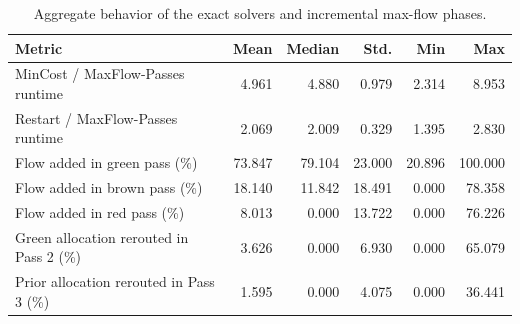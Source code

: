 \begin{table}
\caption{Aggregate behavior of the exact solvers and incremental max-flow phases.}
\label{tab:pass-mechanism-summary}
\begin{tabular}{lrrrrr}
\toprule
Metric & Mean & Median & Std. & Min & Max \\
\midrule
MinCost / MaxFlow-Passes runtime & 4.961 & 4.880 & 0.979 & 2.314 & 8.953 \\
Restart / MaxFlow-Passes runtime & 2.069 & 2.009 & 0.329 & 1.395 & 2.830 \\
Flow added in green pass (\%) & 73.847 & 79.104 & 23.000 & 20.896 & 100.000 \\
Flow added in brown pass (\%) & 18.140 & 11.842 & 18.491 & 0.000 & 78.358 \\
Flow added in red pass (\%) & 8.013 & 0.000 & 13.722 & 0.000 & 76.226 \\
Green allocation rerouted in Pass 2 (\%) & 3.626 & 0.000 & 6.930 & 0.000 & 65.079 \\
Prior allocation rerouted in Pass 3 (\%) & 1.595 & 0.000 & 4.075 & 0.000 & 36.441 \\
\bottomrule
\end{tabular}
\end{table}
